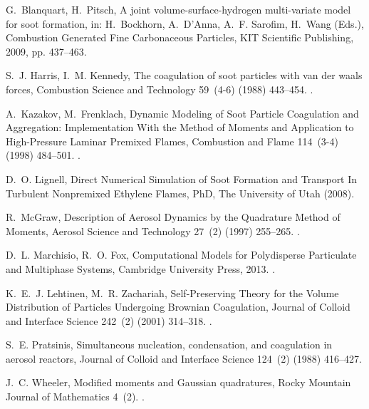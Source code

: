 \documentclass[preprint,letterpaper]{elsarticle}
\begin{document}
\begin{thebibliography}{10}
G.~Blanquart, H.~Pitsch, {A joint volume-surface-hydrogen multi-variate model
  for soot formation}, in: H.~Bockhorn, A.~D'Anna, A.~F. Sarofim, H.~Wang
  (Eds.), {Combustion Generated Fine Carbonaceous Particles}, {KIT Scientific
  Publishing}, 2009, pp. 437--463.

S.~J. Harris, I.~M. Kennedy, The coagulation of soot particles with van der
  waals forces, Combustion Science and Technology 59~(4-6) (1988) 443--454.
\newblock \href {http://dx.doi.org/10.1080/00102208808947110}
  {}.

A.~Kazakov, M.~Frenklach, {Dynamic Modeling of Soot Particle Coagulation and
  Aggregation: Implementation With the Method of Moments and Application to
  High-Pressure Laminar Premixed Flames}, {Combustion and Flame} 114~(3-4)
  (1998) 484--501.
\newblock \href {http://dx.doi.org/10.1016/S0010-2180(97)00322-2}
  {}.

D.~O. Lignell, {Direct Numerical Simulation of Soot Formation and Transport In
  Turbulent Nonpremixed Ethylene Flames}, {PhD}, {The University of Utah}
  (2008).

R.~McGraw, {Description of Aerosol Dynamics by the Quadrature Method of
  Moments}, {Aerosol Science and Technology} 27~(2) (1997) 255--265.
\newblock \href {http://dx.doi.org/10.1080/02786829708965471}
  {}.

D.~L. Marchisio, R.~O. Fox, {Computational Models for Polydisperse Particulate
  and Multiphase Systems}, {Cambridge University Press}, 2013.
\newblock \href {http://dx.doi.org/10.1017/CBO9781139016599}
  {}.

K.~E.~J. Lehtinen, M.~R. Zachariah, {Self-Preserving Theory for the Volume
  Distribution of Particles Undergoing Brownian Coagulation}, {Journal of
  Colloid and Interface Science} 242~(2) (2001) 314--318.
\newblock \href {http://dx.doi.org/10.1006/jcis.2001.7791}
  {}.

S.~E. Pratsinis, Simultaneous nucleation, condensation, and coagulation in
  aerosol reactors, Journal of Colloid and Interface Science 124~(2) (1988)
  416--427.

J.~C. Wheeler, {Modified moments and Gaussian quadratures}, {Rocky Mountain
  Journal of Mathematics} 4~(2).
\newblock \href {http://dx.doi.org/10.1216/RMJ-1974-4-2-287}
  {}.


\end{thebibliography}
\end{document}

